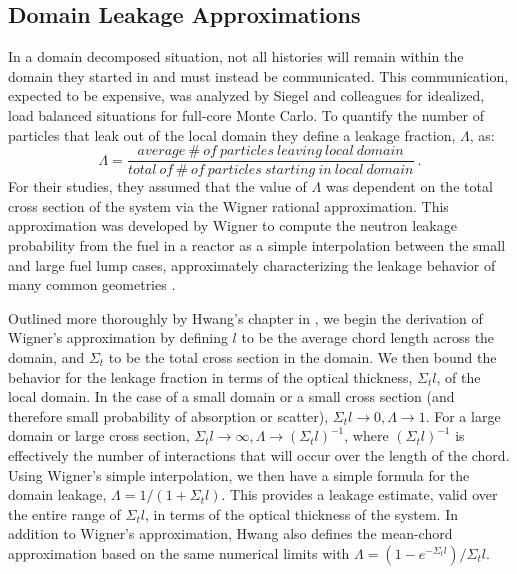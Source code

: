 \documentclass[letterpaper,12pt]{article}
\begin{document}
\subsection{Domain Leakage Approximations}
In a domain decomposed situation, not all histories will remain
within the domain they started in and must instead be
communicated. This communication, expected to be expensive, was
analyzed by Siegel and colleagues for idealized, load balanced
situations for full-core Monte Carlo\cite{siegel_analysis_2012}.  To
quantify the number of particles that leak out of the local domain
they define a leakage fraction, $\Lambda$, as:
\begin{equation}
  \Lambda = \frac{average\ \#\ of\ particles\ leaving\ local\ domain}
          {total\ of\ \#\ of\ particles\ starting\ in\ local\ domain}\:.
  \label{eq:leakage_fraction}
\end{equation}
For their studies, they assumed that the value of $\Lambda$ was
dependent on the total cross section of the system via the Wigner
rational approximation. This approximation was developed by Wigner to
compute the neutron leakage probability from the fuel in a reactor as
a simple interpolation between the small and large fuel lump cases,
approximately characterizing the leakage behavior of many common
geometries \cite{duderstadt_nuclear_1976}. 

Outlined more thoroughly by Hwang's chapter in
\cite{azmy_nuclear_2010}, we begin the derivation of Wigner's
approximation by defining $l$ to be the average chord length across
the domain, and $\Sigma_t$ to be the total cross section in the
domain. We then bound the behavior for the leakage fraction in terms
of the optical thickness, $\Sigma_t l$, of the local domain. In the
case of a small domain or a small cross section (and therefore small
probability of absorption or scatter), $\Sigma_t l \rightarrow 0,
\Lambda \rightarrow 1$. For a large domain or large cross section,
$\Sigma_t l \rightarrow \infty, \Lambda \rightarrow (\Sigma_t
l)^{-1}$, where $(\Sigma_t l)^{-1}$ is effectively the number of
interactions that will occur over the length of the chord. Using
Wigner's simple interpolation, we then have a simple formula for the
domain leakage, $\Lambda = 1/(1+\Sigma_t l)$. This provides a leakage
estimate, valid over the entire range of $\Sigma_t l$, in terms of the
optical thickness of the system. In addition to Wigner's
approximation, Hwang also defines the mean-chord approximation based
on the same numerical limits with $\Lambda = (1-e^{-\Sigma_t
  l})/\Sigma_t l$.
\end{document}
